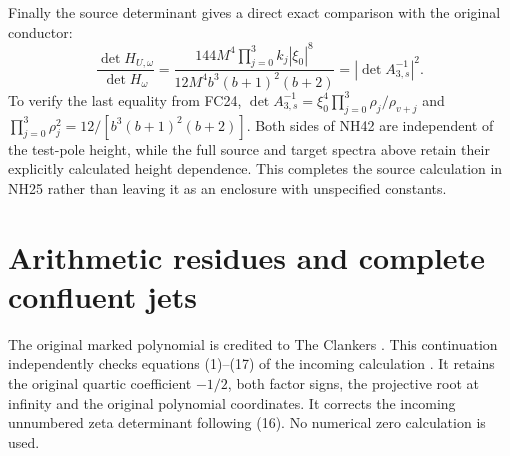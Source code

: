 \documentclass[11pt]{article}
\begin{document}
Finally the source determinant gives a direct exact
comparison with the original conductor:
\[
 \frac{\det H_{U,\omega}}{\det H_\omega}
 =\frac{144M^4\prod_{j=0}^3 k_j|\xi_0|^8}
        {12M^4b^3(b+1)^2(b+2)}
 =|\det A_{3,s}^{-1}|^2.
 \tag{NH42}
\]
To verify the last equality from FC24,
$\det A_{3,s}^{-1}=\xi_0^4\prod_{j=0}^3\rho_j/\rho_{v+j}$
and $\prod_{j=0}^3\rho_j^2=12/[b^3(b+1)^2(b+2)]$.
Both sides of NH42 are independent of the test-pole height,
while the full source and target spectra above retain
their explicitly calculated height dependence. This
completes the source calculation in NH25 rather than
leaving it as an enclosure with unspecified constants.

\section{Arithmetic residues and complete confluent jets}

The original marked polynomial is credited to The Clankers \cite{ES488}. This continuation independently checks equations (1)--(17) of the incoming
calculation \cite{ResidueIntake}. It retains the original quartic
coefficient $-1/2$, both factor signs, the projective root at
infinity and the original polynomial coordinates. It corrects
the incoming unnumbered zeta determinant following (16).
No numerical zero calculation is used.
\end{document}
